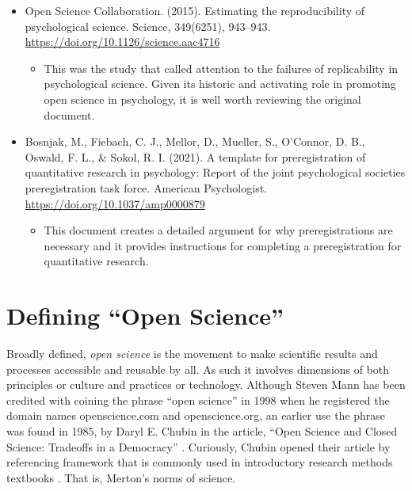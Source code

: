 \documentclass[
  11pt,
]{book}
\providecommand{\tightlist}{%
  \setlength{\itemsep}{0pt}\setlength{\parskip}{0pt}}
\begin{document}
\begin{itemize}
\tightlist
\item
  Open Science Collaboration. (2015). Estimating the reproducibility of psychological science. Science, 349(6251), 943--943. \url{https://doi.org/10.1126/science.aac4716}

  \begin{itemize}
  \tightlist
  \item
    This was the study that called attention to the failures of replicability in psychological science. Given its historic and activating role in promoting open science in psychology, it is well worth reviewing the original document.
  \end{itemize}
\item
  Bosnjak, M., Fiebach, C. J., Mellor, D., Mueller, S., O'Connor, D. B., Oswald, F. L., \& Sokol, R. I. (2021). A template for preregistration of quantitative research in psychology: Report of the joint psychological societies preregistration task force. American Psychologist. \url{https://doi.org/10.1037/amp0000879}

  \begin{itemize}
  \tightlist
  \item
    This document creates a detailed argument for why preregistrations are necessary and it provides instructions for completing a preregistration for quantitative research.
  \end{itemize}
\end{itemize}

\hypertarget{defining-open-science}{%
\section{Defining ``Open Science''}\label{defining-open-science}}

Broadly defined, \emph{open science} is the movement to make scientific results and processes accessible and reusable by all. As such it involves dimensions of both principles or culture and practices or technology. Although Steven Mann has been credited with coining the phrase ``open science'' in 1998 when he registered the domain names openscience.com and openscience.org, an earlier use the phrase was found in 1985, by Daryl E. Chubin in the article, ``Open Science and Closed Science: Tradeoffs in a Democracy'' \citep{noauthor_open_2022}. Curiously, Chubin opened their article by referencing framework that is commonly used in introductory research methods textbooks \citep[e.g.,][]{krathwohl_methods_2009}. That is, Merton's norms of science.
\end{document}
